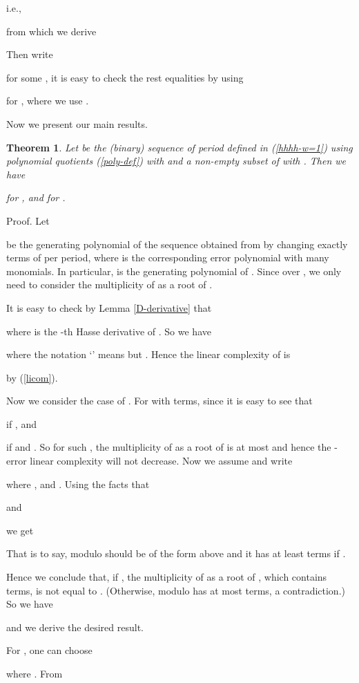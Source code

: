 \documentclass [11pt,a4paper]{article}
\newtheorem{theorem}{Theorem}
\begin{document}
i.e.,

from which we derive

Then write

for some , it is  easy to check the rest equalities by using

for , where we use . ~\hfill 


Now we present our main results.



\begin{theorem}\label{klc-p-w=1}
Let  be the (binary) sequence of period  defined in (\ref{hhhh-w=1}) using polynomial quotients (\ref{poly-def}) with  and a non-empty subset  of  with .
Then we have

for , and  for .
\end{theorem}
Proof. Let

be the generating polynomial of the sequence obtained from  by changing exactly  terms of  per period,
where  is the corresponding error polynomial with  many  monomials. In particular,  is the generating polynomial of . Since  over , we only need to consider the multiplicity of  as a root of .

It is easy to check by Lemma \ref{D-derivative} that

where  is the -th Hasse derivative of . So we have

where the notation `' means  but .
Hence the linear complexity of  is

by (\ref{licom}).

Now we consider the case of . For  with  terms, since  it is easy to see that

if , and

if   and . So for such , the multiplicity of  as a root of  is at most  and hence the -error linear complexity will not decrease. Now
we assume  and write

where ,  and .
Using the facts that

and

we get

That is to say,  modulo  should be of the form above and it has at least  terms if .

Hence we conclude that, if , the multiplicity of  as a root of , which contains  terms, is not equal to . (Otherwise,  modulo  has at most  terms, a contradiction.) So we have

and we derive the desired result.

For , one can choose

where . From
\end{document}
